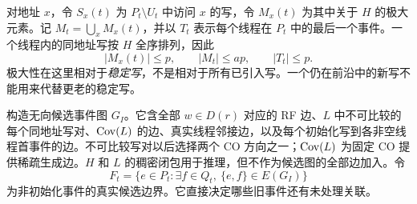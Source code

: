 对地址 $x$，令 $S_x(t)$ 为 $P_t\setminus U_t$ 中访问 $x$ 的写，令 $M_x(t)$ 为其中关于 $H$ 的极大元素。记 $M_t=\bigcup_x M_x(t)$，并以 $T_t$ 表示每个线程在 $P_t$ 中的最后一个事件。一个线程内的同地址写按 $H$ 全序排列，因此
\begin{equation}\label{eq:maxwrites}
 |M_x(t)|\le p,\qquad |M_t|\le ap,\qquad |T_t|\le p.
\end{equation}
极大性在这里相对于\emph{稳定写}，不是相对于所有已引入写。一个仍在前沿中的新写不能用来代替更老的稳定写。

构造无向候选事件图 $G_I$。它含全部 $w\in D(r)$ 对应的 RF 边、$L$ 中不可比较的每个同地址写对、$\operatorname{Cov}(L)$ 的边、真实线程邻接边，以及每个初始化写到各非空线程首事件的边。不可比较写对以后选择两个 CO 方向之一；$\operatorname{Cov}(L)$ 为固定 CO 提供稀疏生成边。$H$ 和 $L$ 的稠密闭包用于推理，但不作为候选图的全部边加入。令
\[
 F_t=\{e\in P_t:\exists f\in Q_t,\ \{e,f\}\in E(G_I)\}
\]
为非初始化事件的真实候选边界。它直接决定哪些旧事件还有未处理关联。

